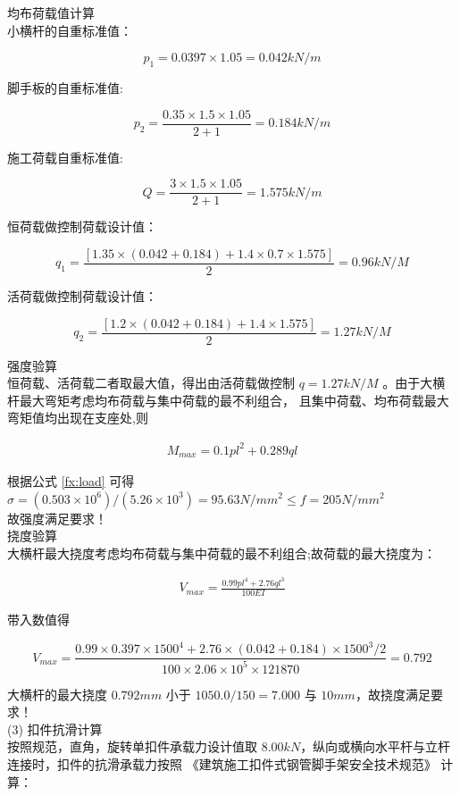  均布荷载值计算\\

小横杆的自重标准值：

$$p_1=0.0397 \times 1.05=0.042 kN/m$$

脚手板的自重标准值:

$$p_2=\frac{0.35 \times 1.5\times 1.05}{2+1}=0.184 kN/m$$

施工荷载自重标准值:

$$Q=\frac{3 \times 1.5\times 1.05}{2+1}=1.575 kN/m$$

恒荷载做控制荷载设计值：

$$q_1=\frac{[1.35\times(0.042+0.184)+1.4\times 0.7\times 1.575]}{2}=0.96 kN/M$$

活荷载做控制荷载设计值：

$$q_2=\frac{[1.2\times(0.042+0.184)+1.4\times 1.575]}{2}=1.27 kN/M$$

 强度验算\\

恒荷载、活荷载二者取最大值，得出由活荷载做控制 $q=1.27 kN/M$ 。由于大横杆最大弯矩考虑均布荷载与集中荷载的最不利组合，
且集中荷载、均布荷载最大弯矩值均出现在支座处,则

\begin{align}
    M_{max}=0.1pl^2+0.289ql
\end{align}

根据公式 \ref{fx:load} 可得 $\sigma =(0.503\times 10^6)/(5.26\times 10^3)=95.63 N/mm^2 \leq f=205 N/mm^2$\\
故强度满足要求！\\

 挠度验算\\

大横杆最大挠度考虑均布荷载与集中荷载的最不利组合;故荷载的最大挠度为：

\begin{align}
    V_{max}=\frac{0.99pl^4+2.76ql^3}{100EI}
\end{align}

带入数值得

$$V_{max}=\frac{0.99\times 0.397\times 1500^4+2.76\times (0.042+0.184)\times 1500^3/2}{100\times 2.06\times 10^5\times 121870}=0.792$$

大横杆的最大挠度 $0.792mm$ 小于 $1050.0/150=7.000$ 与 $10mm$，故挠度满足要求！ \\

(3) 扣件抗滑计算\\

按照规范，直角，旋转单扣件承载力设计值取 $8.00kN$，纵向或横向水平杆与立杆连接时，扣件的抗滑承载力按照 《建筑施工扣件式钢管脚手架安全技术规范》 计算：

